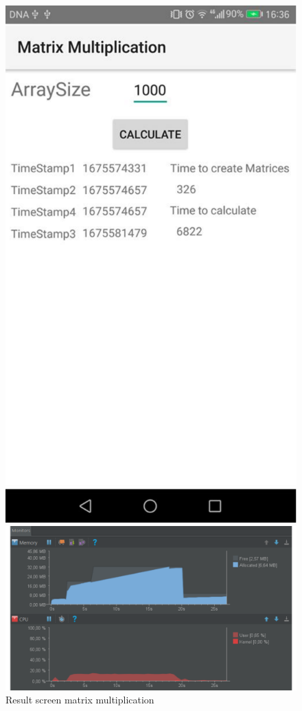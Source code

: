 \documentclass[a4paper, 11pt]{report}
\begin{document}
\begin{figure}[ht]
	\begin{minipage}[t]{0.4\textwidth}
	\centering
	\includegraphics[scale=0.3]{images/app1result.pdf}
	\caption{Result screen matrix multiplication}\label{fig:app1Result}
	\end{minipage}
	\begin{minipage}[t]{0.5\textwidth}
	\centering
	\includegraphics[scale=0.3]{images/app1usage.pdf}

\end{minipage}
\end{figure}
\end{document}

